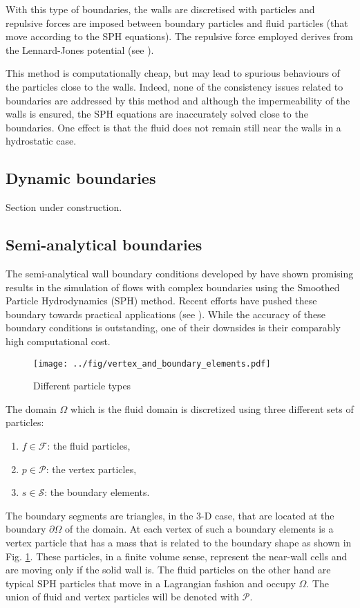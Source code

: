 \documentclass{../GPUSPHtemplate}
\begin{document}
With this type of boundaries, the walls are discretised with particles and
repulsive forces are imposed between boundary particles and
fluid particles (that move according to the SPH equations).
The repulsive force employed derives from the Lennard-Jones potential
(see \cite{Monaghan2005}).

This method is computationally cheap, but may lead to
spurious behaviours of the particles close to the walls.
Indeed, none of the consistency issues related to boundaries
are addressed by this method and although
the impermeability of the walls is ensured,
the SPH equations are inaccurately solved close to the boundaries.
One effect is that the fluid does not remain
still near the walls in a hydrostatic case.

\subsection{Dynamic boundaries}

Section under construction.

\subsection{Semi-analytical boundaries}

The semi-analytical wall boundary conditions developed by
\cite{ferrand_unified_2012} have shown promising results in the
simulation of flows with complex boundaries using the Smoothed Particle
Hydrodynamics (SPH) method. Recent efforts have pushed these boundary
towards practical applications
(see \cite{mayrhofer_unified_2014, leroy_unified_2014}).
While the accuracy of these boundary conditions is outstanding, one of
their downsides is their comparably high computational cost.
\begin{figure}[htb]
\centering
\texttt{[image: ../fig/vertex\_and\_boundary\_elements.pdf]}
\caption{Different particle types}
\label{fig:sa:types}
\end{figure}
The domain $\Omega$ which is the fluid domain is discretized using three different sets of particles:
\begin{enumerate}
\item $f \in \mathcal{F}$: the fluid particles,
\item $p \in \mathcal{P}$: the vertex particles,
\item $s \in \mathcal{S}$: the boundary elements.
\end{enumerate}
The boundary segments are triangles, in the 3-D case, that are located at the boundary $\partial \Omega$ of the domain. At each vertex of such a boundary elements is a vertex particle that has a mass that is related to the boundary shape as shown in Fig. \ref{fig:sa:types}. These particles, in a finite volume sense, represent the near-wall cells and are moving only if the solid wall is. The fluid particles on the other hand are typical SPH particles that move in a Lagrangian fashion and occupy $\Omega$. The union of fluid and vertex particles will be denoted with $\mathcal{P}$.
\end{document}
